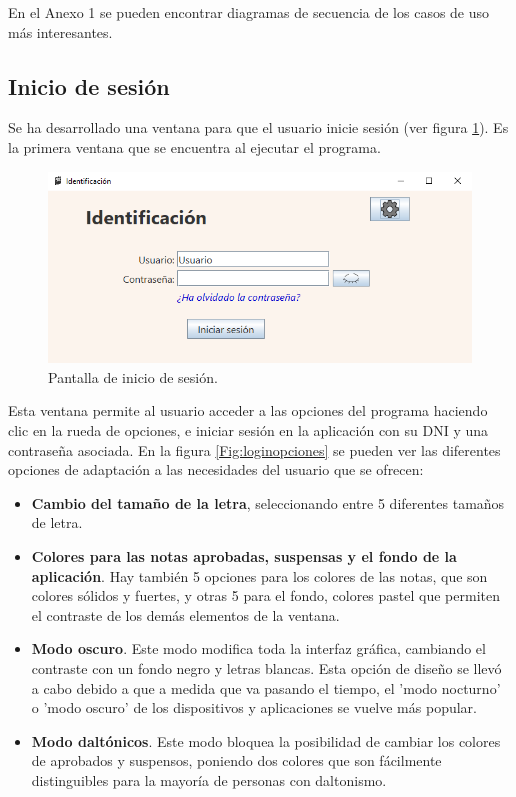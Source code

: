 En el Anexo 1 se pueden encontrar diagramas de secuencia de los casos de uso más interesantes.

\subsection{Inicio de sesión}
Se ha desarrollado una ventana para que el usuario inicie sesión (ver figura \ref{Fig:login}). Es la primera ventana que se encuentra al ejecutar el programa.

\begin{figure}[h]
\centering\includegraphics[width=1\linewidth]{figs/login.png}
\caption{Pantalla de inicio de sesión.}
\label{Fig:login}
\end{figure}


Esta ventana permite al usuario acceder a las opciones del programa haciendo clic en la rueda de opciones, e iniciar sesión en la aplicación con su DNI y una contraseña asociada. En la figura \ref{Fig:loginopciones} se pueden ver las diferentes opciones de adaptación a las necesidades del usuario que se ofrecen:
\begin{itemize}
	\item \textbf{Cambio del tamaño de la letra}, seleccionando entre 5 diferentes tamaños de letra.
	\item \textbf{Colores para las notas aprobadas, suspensas y el fondo de la aplicación}. Hay también 5 opciones para los colores de las notas, que son colores sólidos y fuertes, y otras 5 para el fondo, colores pastel que permiten el contraste de los demás elementos de la ventana.
	\item \textbf{Modo oscuro}. Este modo modifica toda la interfaz gráfica, cambiando el contraste con un fondo negro y letras blancas. Esta opción de diseño se llevó a cabo debido a que a medida que va pasando el tiempo, el 'modo nocturno' o 'modo oscuro' de los dispositivos y aplicaciones se vuelve más popular.
	\item \textbf{Modo daltónicos}. Este modo bloquea la posibilidad de cambiar los colores de aprobados y suspensos, poniendo dos colores que son fácilmente distinguibles para la mayoría de personas con daltonismo.
\end{itemize}

